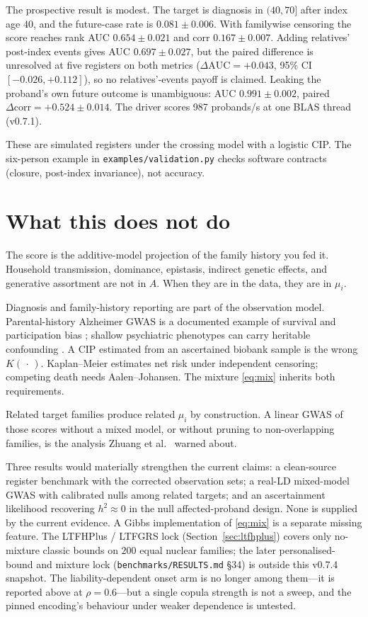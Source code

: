 \documentclass[11pt,a4paper]{article}
\newcommand{\h}{h^{2}}
\begin{document}
The prospective result is modest.
The target is diagnosis in $(40,70]$ after index age $40$, and the
future-case rate is $0.081\pm 0.006$.
With familywise censoring the score reaches rank AUC $0.654\pm 0.021$
and corr $0.167\pm 0.007$.
Adding relatives' post-index events gives AUC $0.697\pm 0.027$, but
the paired difference is unresolved at five registers on both metrics
($\Delta\mathrm{AUC}=+0.043$, 95\% CI $[-0.026,+0.112]$), so no
relatives'-events payoff is claimed.
Leaking the proband's own future outcome is unambiguous: AUC
$0.991\pm 0.002$, paired $\Delta\mathrm{corr}=+0.524\pm 0.014$.
The driver scores 987 probands/s at one BLAS thread (v0.7.1).

These are simulated registers under the crossing model with a logistic
CIP.
The six-person example in \texttt{examples/validation.py} checks software contracts (closure,
post-index invariance), not accuracy.

\section{What this does not do}
\label{sec:limits}

The score is the additive-model projection of the family history
you fed it.
Household transmission, dominance, epistasis, indirect genetic
effects, and generative assortment are not in $A$.
When they are in the data, they are in $\mu_i$.

Diagnosis and family-history reporting are part of the observation
model.
Parental-history Alzheimer GWAS is a documented example of
survival and participation bias \cite{wu2024}; shallow psychiatric
phenotypes can carry heritable confounding \cite{cai2026}.
A CIP estimated from an ascertained biobank sample is the wrong
$K(\,\cdot\,)$.
Kaplan--Meier estimates net risk under independent censoring;
competing death needs Aalen--Johansen.
The mixture \eqref{eq:mix} inherits both requirements.

Related target families produce related $\mu_i$ by construction.
A linear GWAS of those scores without a mixed model, or without
pruning to non-overlapping families, is the analysis
Zhuang et al.\ \cite{zhuang2022} warned about.

Three results would materially strengthen the current claims: a
clean-source register benchmark with the corrected observation sets;
a real-LD mixed-model GWAS with calibrated nulls among related targets;
and an ascertainment likelihood recovering $\h\approx0$ in the
null affected-proband design. None is supplied by the current evidence.
A Gibbs implementation of \eqref{eq:mix} is a separate missing feature.
The LTFHPlus / LTFGRS lock
(Section~\ref{sec:ltfhplus}) covers only no-mixture classic
bounds on $200$ equal nuclear families; the later personalised-bound and
mixture lock (\texttt{benchmarks/RESULTS.md} \S34) is outside this v0.7.4 snapshot.
The liability-dependent onset arm is no longer among them---it is
reported above at $\rho=0.6$---but a single copula strength is not
a sweep, and the pinned encoding's behaviour under weaker
dependence is untested.
\end{document}
